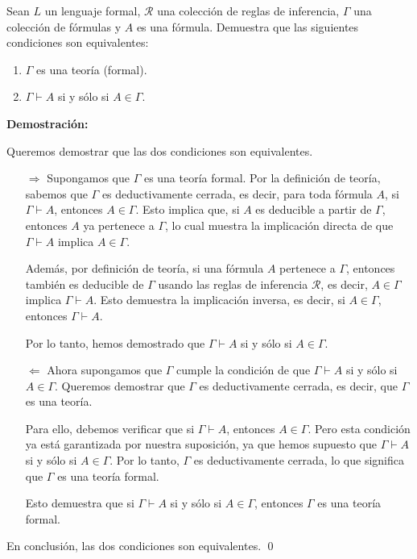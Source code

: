 \begin{solution}
Sean $L$ un lenguaje formal, $\mathscr{R}$ una colección de reglas de inferencia, $\Gamma$ una colección de fórmulas y $A$ es una fórmula. Demuestra que las siguientes condiciones son equivalentes:
    \begin{enumerate}
        \item $\Gamma$ es una teoría (formal).
        \item $\Gamma \vdash A$ si y sólo si $A \in \Gamma$.
    \end{enumerate}

\textbf{Demostración:}

Queremos demostrar que las dos condiciones son equivalentes.

\begin{itemize}
    \item[$\Rightarrow$] Supongamos que $\Gamma$ es una teoría formal. Por la definición de teoría, sabemos que $\Gamma$ es deductivamente cerrada, es decir, para toda fórmula $A$, si $\Gamma \vdash A$, entonces $A \in \Gamma$. Esto implica que, si $A$ es deducible a partir de $\Gamma$, entonces $A$ ya pertenece a $\Gamma$, lo cual muestra la implicación directa de que $\Gamma \vdash A$ implica $A \in \Gamma$.

    Además, por definición de teoría, si una fórmula $A$ pertenece a $\Gamma$, entonces también es deducible de $\Gamma$ usando las reglas de inferencia $\mathscr{R}$, es decir, $A \in \Gamma$ implica $\Gamma \vdash A$. Esto demuestra la implicación inversa, es decir, si $A \in \Gamma$, entonces $\Gamma \vdash A$.

    Por lo tanto, hemos demostrado que $\Gamma \vdash A$ si y sólo si $A \in \Gamma$.

    \item[$\Leftarrow$] Ahora supongamos que $\Gamma$ cumple la condición de que $\Gamma \vdash A$ si y sólo si $A \in \Gamma$. Queremos demostrar que $\Gamma$ es deductivamente cerrada, es decir, que $\Gamma$ es una teoría.

    Para ello, debemos verificar que si $\Gamma \vdash A$, entonces $A \in \Gamma$. Pero esta condición ya está garantizada por nuestra suposición, ya que hemos supuesto que $\Gamma \vdash A$ si y sólo si $A \in \Gamma$. Por lo tanto, $\Gamma$ es deductivamente cerrada, lo que significa que $\Gamma$ es una teoría formal.

    Esto demuestra que si $\Gamma \vdash A$ si y sólo si $A \in \Gamma$, entonces $\Gamma$ es una teoría formal.
\end{itemize}

En conclusión, las dos condiciones son equivalentes. \qed

\end{solution}